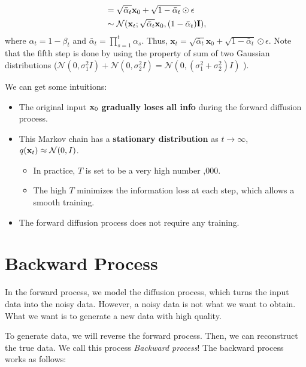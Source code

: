 \begin{itemize}
\begin{align}
						   &= \sqrt{\bar{\alpha}_t} \mathbf{x}_{0}+ \sqrt{1-\bar{\alpha}_t} \odot \epsilon\\
	&\sim \mathcal{N}(\mathbf{x}_t; \sqrt{\bar{\alpha}_t} {\mathbf{x}}_{0}, (1-\bar{\alpha}_t)\mathbf{I}),
	\label{eq:diffusion_forward_sampling}
\end{align}
			where $\alpha_t = 1-\beta_t$ and $\bar{\alpha}_t = \prod_{s=1}^t \alpha_s$. Thus, $\mathbf{x}_t= \sqrt{\bar{\alpha}_t} \mathbf{x}_{0}+ \sqrt{1-\bar{\alpha}_t} \odot \epsilon$. Note that the fifth step is done by using the property of sum of two Gaussian distributions (\eg $\mathcal{N}(0, \sigma_1^2I)+\mathcal{N}(0, \sigma_2^2I) = \mathcal{N}(0, (\sigma_1^2+\sigma_2^2)I)$ ). 
\end{itemize}

We can get some intuitions:
\begin{itemize}
	\item The original input ${\mathbf{x}}_0$ \textbf{gradually loses all info} during the forward diffusion process.
	\item This Markov chain has a \textbf{stationary distribution} \ie as $t\to \infty$, $q({\mathbf{x}}_t) \approx \mathcal{N}(0,I)$.
		\begin{itemize}
			\item In practice, $T$ is set to be a very high number ,000.
			\item The high $T$ minimizes the information loss at each step, which allows a smooth training.
		\end{itemize}
	\item The forward diffusion process does not require any training.
\end{itemize}

\section{Backward Process}

In the forward process, we model the diffusion process, which turns the input data into the noisy data. However, a noisy data is not what we want to obtain. What we want is to generate a new data with high quality.

To generate data, we will reverse the forward process. Then, we can reconstruct the true data. We call this process \textit{Backward process}! The backward process works as follows:

